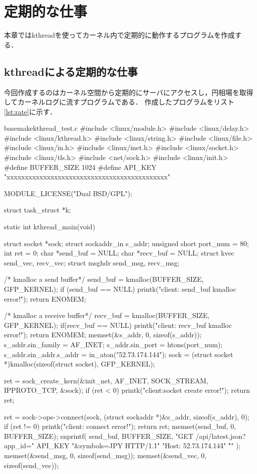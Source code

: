 \chapter{定期的な仕事}
本章ではkthreadを使ってカーネル内で定期的に動作するプログラムを作成する．

\section{kthreadによる定期的な仕事}
今回作成するのはカーネル空間から定期的にサーバにアクセスし，円相場を取得してカーネルログに流すプログラムである．
作成したプログラムをリスト\ref{lst:rate}に示す．
\begin{longlisting}
\begin{myminted}{basemake}{kthread\_test.c}
#include <linux/module.h>
#include <linux/delay.h>
#include <linux/kthread.h>
#include <linux/string.h>
#include <linux/file.h>
#include <linux/in.h>
#include <linux/inet.h>
#include <linux/socket.h>
#include <linux/tls.h>
#include <net/sock.h>
#include <linux/init.h>
#define BUFFER_SIZE 1024
#define API_KEY "xxxxxxxxxxxxxxxxxxxxxxxxxxxxxxxxxxxxxxxxxxxx"

MODULE_LICENSE("Dual BSD/GPL");

struct task_struct *k;

static int kthread_main(void) {
    struct socket *sock;
    struct sockaddr_in s_addr;
    unsigned short port_num = 80;
    int ret = 0;
    char *send_buf = NULL;
    char *recv_buf = NULL;
    struct kvec send_vec, recv_vec;
    struct msghdr send_msg, recv_msg;

    /* kmalloc a send buffer*/
    send_buf = kmalloc(BUFFER_SIZE, GFP_KERNEL);
    if (send_buf == NULL) {
        printk("client: send_buf kmalloc error!\n");
        return ENOMEM;
    }

    /* kmalloc a receive buffer*/
    recv_buf = kmalloc(BUFFER_SIZE, GFP_KERNEL);
    if(recv_buf == NULL){
        printk("client: recv_buf kmalloc error!\n");
        return ENOMEM;
    }
    memset(&s_addr, 0, sizeof(s_addr));
    s_addr.sin_family = AF_INET;
    s_addr.sin_port = htons(port_num);
    s_addr.sin_addr.s_addr = in_aton("52.73.174.144");
    sock = (struct socket *)kmalloc(sizeof(struct socket), GFP_KERNEL);

    ret = sock_create_kern(&init_net, AF_INET, SOCK_STREAM, IPPROTO_TCP, &sock);
    if (ret < 0) {
        printk("client:socket create error!\n");
        return ret;
    } 

    ret = sock->ops->connect(sock, (struct sockaddr *)&s_addr, sizeof(s_addr), 0);
    if (ret != 0) {
        printk("client: connect error!\n");
        return ret;
    }
    memset(send_buf, 0, BUFFER_SIZE);
    snprintf(
        send_buf,
        BUFFER_SIZE,
        "GET /api/latest.json?app_id="
        API_KEY
        "&symbols=JPY HTTP/1.1\r\n"
        "Host: 52.73.174.144\r\n"
        "\r\n"
    );
    memset(&send_msg, 0, sizeof(send_msg));
    memset(&send_vec, 0, sizeof(send_vec));

}
\end{myminted}
\end{longlisting}

